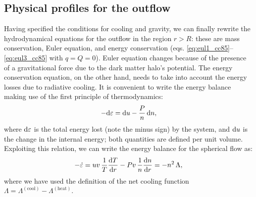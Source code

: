 \subsection{Physical profiles for the outflow} \label{sec:outflow_profiles}

Having specified the conditions for cooling and gravity, we can finally rewrite the hydrodynamical equations for the outflow in the region $r>R$: these are mass conservation, Euler equation, and energy conservation (eqs. \ref{eq:eul1_cc85}--\ref{eq:eul3_cc85} with $q=Q=0$). Euler equation changes because of the presence of a gravitational force due to the dark matter halo's potential. The energy conservation equation, on the other hand, needs to take into account the energy losses due to radiative cooling. It is convenient to write the energy balance making use of the first principle of thermodynamics:
\begin{align}
-\mathrm{d} \varepsilon = \mathrm{d} u - \frac{P}{n}\,\mathrm{d} n,
\end{align}
where $\mathrm{d} \varepsilon$ is the total energy lost (note the minus sign) by the system, and $\mathrm{d} u$ is the change in the internal energy; both quantities are defined per unit volume. Exploiting this relation, we can write the energy balance for the spherical flow as:
\begin{align}
-\dot{\varepsilon}  = uv \,\frac{1}{T}\frac{\mathrm{d} T}{\mathrm{d} r} - Pv\,\frac{1}{n}\frac{\mathrm{d} n}{\mathrm{d} r} = - n^2 \,\Lambda,
\end{align}
where we have used the definition of the net cooling function $\Lambda = \Lambda^\mathrm{(cool)}-\Lambda^\mathrm{(heat)}$. 

